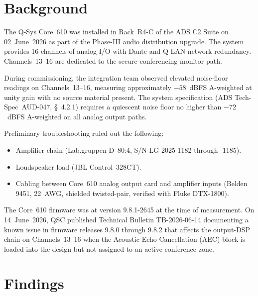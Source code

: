 \documentclass[11pt,letterpaper]{article}
\begin{document}
\section{Background}

The Q-Sys Core~610 was installed in Rack~R4-C of the ADS C2 Suite on
02~June~2026 as part of the Phase-III audio distribution upgrade. The system
provides 16 channels of analog I/O with Dante and Q-LAN network redundancy.
Channels~13--16 are dedicated to the secure-conferencing monitor path.

During commissioning, the integration team observed elevated noise-floor
readings on Channels~13--16, measuring approximately $-58$~dBFS A-weighted at
unity gain with no source material present. The system specification (ADS
Tech-Spec~AUD-047, \S~4.2.1) requires a quiescent noise floor no higher than
$-72$~dBFS A-weighted on all analog output paths.

Preliminary troubleshooting ruled out the following:
\begin{itemize}[leftmargin=*, nosep, before=\vspace{2pt}, after=\vspace{0pt}]
  \item Amplifier chain (Lab.gruppen D~80:4, S/N LG-2025-1182 through -1185).
  \item Loudspeaker load (JBL Control~328CT).
  \item Cabling between Core~610 analog output card and amplifier inputs
        (Belden 9451, 22~AWG, shielded twisted-pair, verified with
        Fluke DTX-1800).
\end{itemize}

\medskip

The Core~610 firmware was at version 9.8.1-2645 at the time of measurement. On
14~June~2026, QSC published Technical Bulletin TB-2026-06-14 documenting a known
issue in firmware releases 9.8.0 through 9.8.2 that affects the output-DSP
chain on Channels~13--16 when the Acoustic Echo Cancellation (AEC) block is
loaded into the design but not assigned to an active conference zone.

\section{Findings}
\end{document}
